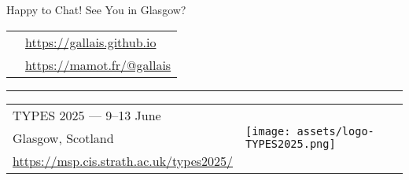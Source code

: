 \documentclass[3to2]{beamer}
\newcommand{\mastodon}{\texttt{[image: assets/mastodon-logo-purple.png]}}
\newcommand{\globe}{\texttt{[image: assets/globe.png]}}
\newcommand{\typesstrathclyde}{\texttt{[image: assets/logo-TYPES2025.png]}}
\begin{document}
\begin{frame}{Happy to Chat! See You in Glasgow?}
  \Large\centering
  \renewcommand\UrlFont{}
  \begin{tabular}{ll}
    \raisebox{-2pt}{\globe} &  \url{https://gallais.github.io} \\
    \raisebox{-4pt}{\mastodon} & \url{https://mamot.fr/@gallais}
  \end{tabular}

  \vfill
  {\centering\rule{.8\textwidth}{1pt}}
  \vfill


  \begin{tabular}{ll}
    TYPES 2025 --- 9–13 June & \multirow{3}{*}{\typesstrathclyde} \\
    Glasgow, Scotland\\
    \url{https://msp.cis.strath.ac.uk/types2025/}
  \end{tabular}
\end{frame}
\end{document}
